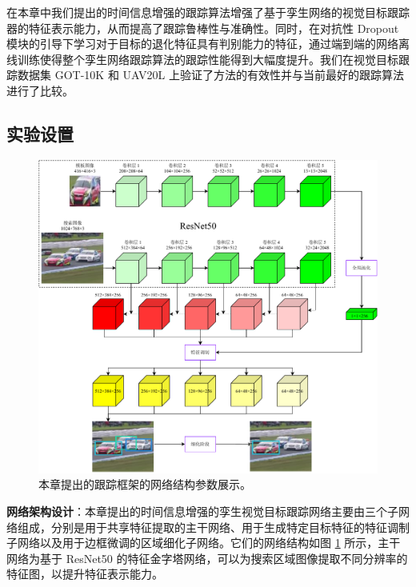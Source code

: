 在本章中我们提出的时间信息增强的跟踪算法增强了基于孪生网络的视觉目标跟踪器的特征表示能力，从而提高了跟踪鲁棒性与准确性。同时，在对抗性 Dropout 模块的引导下学习对于目标的退化特征具有判别能力的特征，通过端到端的网络离线训练使得整个孪生网络跟踪算法的跟踪性能得到大幅度提升。我们在视觉目标跟踪数据集 GOT-10K \cite{GOT-10k} 和 UAV20L \cite{mueller2016benchmark} 上验证了方法的有效性并与当前最好的跟踪算法进行了比较。
\subsection{实验设置}

\begin{figure}[t]
    \centering
    \includegraphics[width=1.0\textwidth]{Img/end/FPN.pdf}
    \caption{本章提出的跟踪框架的网络结构参数展示。}
    \label{fig:end_FPN}
\end{figure}

\textbf{网络架构设计}：本章提出的时间信息增强的孪生视觉目标跟踪网络主要由三个子网络组成，分别是用于共享特征提取的主干网络、用于生成特定目标特征的特征调制子网络以及用于边框微调的区域细化子网络。它们的网络结构如图 \ref{fig:end_FPN} 所示，主干网络为基于 ResNet50 的特征金字塔网络，可以为搜索区域图像提取不同分辨率的特征图，以提升特征表示能力。

